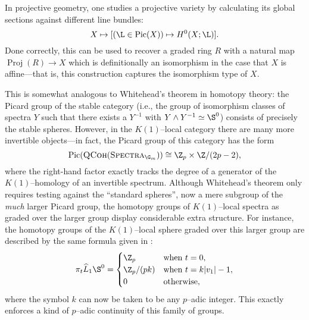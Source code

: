 In projective geometry, one studies a projective variety by calculating its global sections against different line bundles: \[X \mapsto [(\L \in \Pic(X)) \mapsto H^0(X; \L)].\]  Done correctly, this can be used to recover a graded ring \(R\) with a natural map \(\operatorname{Proj}(R) \to X\) which is definitionally an isomorphism in the case that \(X\) is affine---that is, this construction captures the isomorphism type of \(X\).

This is somewhat analogous to Whitehead's theorem in homotopy theory: the Picard group of the stable category (i.e., the group of isomorphism classes of spectra \(Y\) such that there exists a \(Y^{-1}\) with \(Y \sm Y^{-1} \simeq \S^0\)) consists of precisely the stable spheres.  However, in the \(K(1)\)--local category there are many more invertible objects---in fact, the Picard group of this category has the form \[\operatorname{Pic}(\CatOf{QCoh}(\CatOf{Spectra}_{\G_m})) \cong \Z_p \times \Z / (2p-2),\] where the right-hand factor exactly tracks the degree of a generator of the \(K(1)\)--homology of an invertible spectrum.  Although Whitehead's theorem only requires testing against the ``standard spheres'', now a mere subgroup of the \emph{much} larger Picard group, the homotopy groups of \(K(1)\)--local spectra as graded over the larger group display considerable extra structure.  For instance, the homotopy groups of the \(K(1)\)--local sphere graded over this larger group are described by the same formula given in : \[\pi_t \widehat L_1 \S^0 = \begin{cases} \Z_p & \text{when \(t = 0\)}, \\ \Z_p / (pk) & \text{when \(t = k|v_1| - 1\)}, \\ 0 & \text{otherwise}, \end{cases}\] where the symbol \(k\) can now be taken to be any \(p\)--adic integer.  This exactly enforces a kind of \(p\)--adic continuity of this family of groups.

